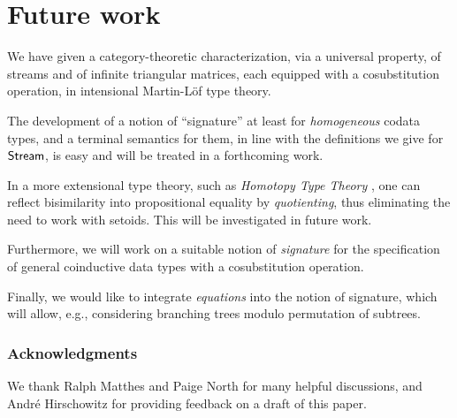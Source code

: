 \documentclass[envcountsame]{llncs}
\begin{document}
\section{Future work}



We have given a category-theoretic characterization, via a universal property, of streams and of infinite triangular matrices,
each equipped with a cosubstitution operation,
in intensional Martin-L\"of type theory.

The development of a notion of \enquote{signature} at least for \emph{homogeneous} codata types, and 
a terminal semantics for them, in line with the definitions we give for $\mathsf{Stream}$, is easy
and will be treated in a forthcoming work.

In a more extensional type theory, such as \emph{Homotopy Type Theory} \parencite{hottbook}, 
one can reflect bisimilarity into propositional equality by \emph{quotienting},
thus eliminating the need to work with setoids.
This will be investigated in future work.

Furthermore, we will work on a suitable notion of \emph{signature} for the specification of general coinductive data types with
a cosubstitution operation.

Finally, we would like to integrate \emph{equations} into the notion of signature, which 
will allow, e.g., considering branching trees modulo permutation of subtrees.
 

\begin{Long}
 
\subsubsection*{Acknowledgments}
 We thank Ralph Matthes and Paige North for many helpful discussions, and Andr\'e Hirschowitz for providing feedback on
 a draft of this paper.

\end{Long}
 
\printbibliography


\appendix




 

% 
\end{document}
